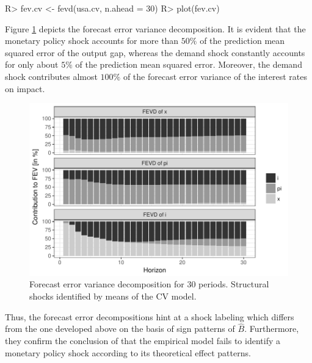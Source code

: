 \documentclass[nojss]{jss}\usepackage[]{graphicx}\usepackage[]{color}
\begin{document}
\begin{CodeChunk}
\begin{CodeInput}
R> fev.cv <- fevd(usa.cv, n.ahead = 30)
R> plot(fev.cv)
\end{CodeInput}
\end{CodeChunk}
Figure \ref{fig:fev_cv} depicts the forecast error variance decomposition. It is evident that the monetary policy shock accounts for more than $50\%$ of the prediction mean squared error of the output gap, whereas the demand shock constantly accounts for only about $5\%$ of the prediction mean squared error. Moreover, the demand shock contributes almost $100\%$ of the forecast error variance of the interest rates on impact.
\begin{figure}[h]
\center
\includegraphics[scale=1]{Figures/FEV_cv}
\caption{Forecast error variance decomposition for $30$ periods. Structural shocks identified by means of the CV model.}
\label{fig:fev_cv}
\end{figure}
Thus, the forecast error decompositions hint at a shock labeling which differs from the one developed above on the basis of sign patterns of  $\widehat{B}$. Furthermore, they confirm the conclusion of \cite{HerwartzPloedt2016} that the empirical model fails to identify a monetary policy shock according to its theoretical effect patterns.\\
\end{document}
